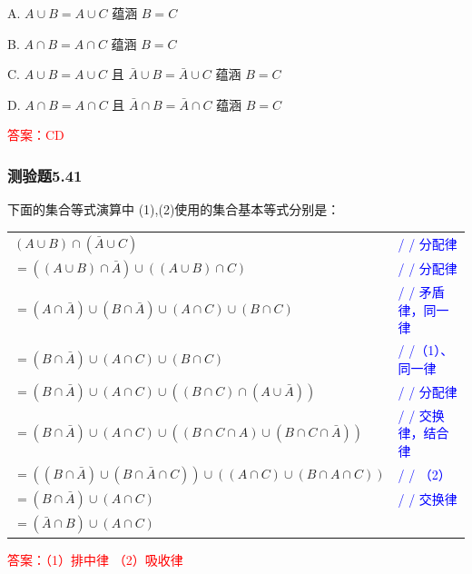 \documentclass[UTF8, heading=true]{ctexart}
\begin{document}
A. $ A \cup B=A \cup C$ 蕴涵 $B=C$

B. $A \cap B=A \cap C$ 蕴涵 $B=C$

C. $A \cup B=A \cup C$ 且 $\bar{A} \cup B=\bar{A} \cup C$ 蕴涵 $B=C$

D. $A \cap B=A \cap C$ 且 $\bar{A} \cap B=\bar{A} \cap C$ 蕴涵 $B=C$

\textcolor{red}{答案：CD}


\subsubsection{测验题5.41}
下面的集合等式演算中 (1),(2)使用的集合基本等式分别是：

\clearpage

\begin{table}[htbp]
  \centering
  \renewcommand{\arraystretch}{1.5}
  \begin{tabular}{ll}
    $(A \cup B) \cap (\bar{A} \cup C)$ & \textcolor{blue}{/ / 分配律} \\
    $=((A \cup B) \cap \bar{A}) \cup ((A \cup B) \cap C)$ & \textcolor{blue}{/ / 分配律} \\
    $=(A \cap \bar{A}) \cup (B \cap \bar{A}) \cup (A \cap C) \cup (B \cap C)$ & \textcolor{blue}{/ / 矛盾律，同一律} \\
    $=(B \cap \bar{A}) \cup (A \cap C) \cup (B \cap C)$ & \textcolor{blue}{/ /（1）、 同一律} \\
    $=(B \cap \bar{A}) \cup (A \cap C) \cup ((B \cap C) \cap (A \cup \bar{A}))$ & \textcolor{blue}{/ / 分配律} \\
    $=(B \cap \bar{A}) \cup (A \cap C) \cup ((B \cap C \cap A) \cup (B \cap C \cap \bar{A}))$ & \textcolor{blue}{/ / 交换律，结合律} \\
    $=((B \cap \bar{A}) \cup (B \cap \bar{A} \cap C)) \cup ((A \cap C) \cup (B \cap A \cap C))$ & \textcolor{blue}{/ / （2）} \\
    $=(B \cap \bar{A}) \cup (A \cap C)$ & \textcolor{blue}{/ / 交换律} \\
    $=(\bar{A} \cap B) \cup (A \cap C)$ & \\
  \end{tabular}
\end{table}



\textcolor{red}{答案：（1）排中律 （2）吸收律}
\end{document}
